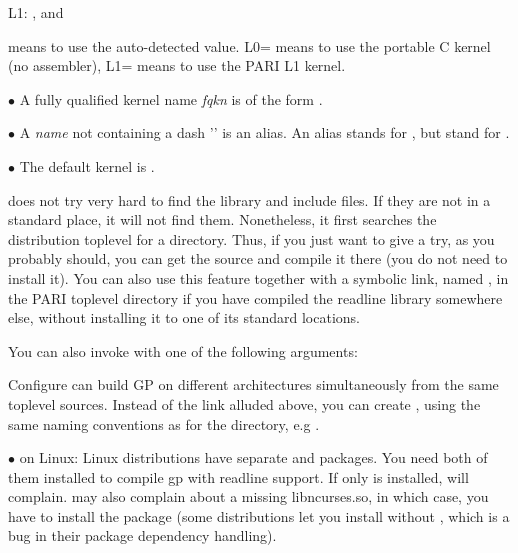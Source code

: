 L1: ,  and 

\noindent {} means to use the auto-detected value. L0= means
to use the portable C kernel (no assembler), L1= means to use the
PARI L1 kernel. 

\noindent$\bullet$ A fully qualified kernel name \emph{fqkn} is of the form
.

\noindent$\bullet$ A \emph{name} not containing a dash '\kbd{-}' is an alias.
An alias stands for , but  stand for
.

\noindent$\bullet$ The default kernel is .

 does not try very hard to find the  library and
include files. If they are not in a standard place, it will not find them.
Nonetheless, it first searches the distribution toplevel for a 
directory. Thus, if you just want to give  a try, as you
probably should, you can get the source and compile it there (you do not need
to install it). You can also use this feature together with a symbolic link,
named , in the PARI toplevel directory if you have compiled the
readline library somewhere else, without installing it to one of its standard
locations. 

You can also invoke  with one of the following arguments:




 Configure can build GP on different architectures
simultaneously from the same toplevel sources. Instead of the 
link alluded above, you can create ,
using the same naming conventions as for the  directory,
e.g .


$\bullet$ on Linux: Linux distributions have separate  and
 packages. You need both of them installed to
compile gp with readline support. If only  is installed,
 will complain.  may also complain about a
missing libncurses.so, in which case, you have to install the
 package (some distributions let you install
 without , which is a bug in
their package dependency handling).

